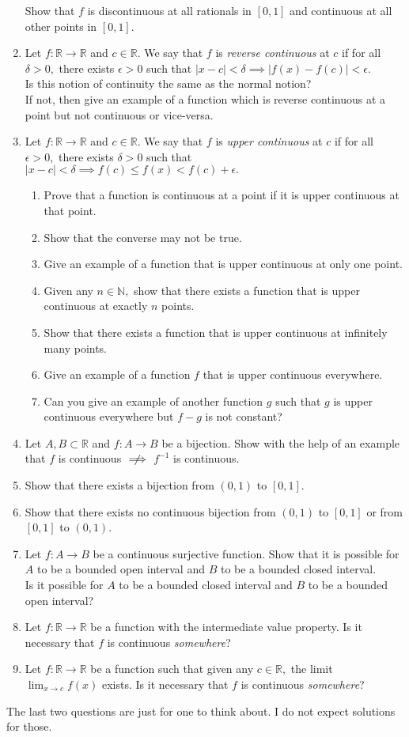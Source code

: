 \documentclass{article}
\begin{document}
\begin{enumerate}
	Show that $f$ is discontinuous at all rationals in $[0, 1]$ and continuous at all other points in $[0, 1].$
	\item Let $f:\mathbb{R} \to \mathbb{R}$ and $c\in\mathbb{R}.$ We say that $f$ is \emph{reverse continuous} at $c$ if for all $\delta > 0,$ there exists $\epsilon > 0$ such that $|x - c| < \delta \implies |f(x) - f(c)| < \epsilon.$\\
	Is this notion of continuity the same as the normal notion?\\
	If not, then give an example of a function which is reverse continuous at a point but not continuous or vice-versa.
	\item  Let $f:\mathbb{R} \to \mathbb{R}$ and $c\in\mathbb{R}.$ We say that $f$ is \emph{upper continuous} at $c$ if for all $\epsilon > 0,$ there exists $\delta > 0$ such that $|x - c| < \delta \implies f(c) \le f(x) < f(c) + \epsilon.$
	\begin{enumerate} 
		\item Prove that a function is continuous at a point if it is upper continuous at that point.
		\item Show that the converse may not be true.
		\item Give an example of a function that is upper continuous at only one point.
		\item Given any $n \in \mathbb{N},$ show that there exists a function that is upper continuous at exactly $n$ points.
		\item Show that there exists a function that is upper continuous at infinitely many points.
		\item Give an example of a function $f$ that is upper continuous everywhere.
		\item Can you give an example of another function $g$ such that $g$ is upper continuous everywhere but $f-g$ is not constant?
	\end{enumerate}
	\item Let $A, B \subset \mathbb{R}$ and $f:A\to B$ be a bijection. Show with the help of an example that $f$ is continuous $\centernot\implies$ $f^{-1}$ is continuous. 
	\item Show that there exists a bijection from $(0, 1)$ to $[0, 1].$
	\item Show that there exists no continuous bijection from $(0, 1)$ to $[0, 1]$ or from $[0, 1]$ to $(0, 1).$
	\item Let $f:A\to B$ be a continuous surjective function. Show that it is possible for $A$ to be a bounded open interval and $B$ to be a bounded closed interval.\\
	Is it possible for $A$ to be a bounded closed interval and $B$ to be a bounded open interval?
	\item Let $f:\mathbb{R}\to\mathbb{R}$ be a function with the intermediate value property. Is it necessary that $f$ is continuous \emph{somewhere}?
	\item Let $f:\mathbb{R}\to\mathbb{R}$ be a function such that given any $c \in \mathbb{R},$ the limit $\displaystyle\lim_{x\to c}f(x)$ exists. Is it necessary that $f$ is continuous \emph{somewhere}?
\end{enumerate}
The last two questions are just for one to think about. I do not expect solutions for those.
\end{document}
